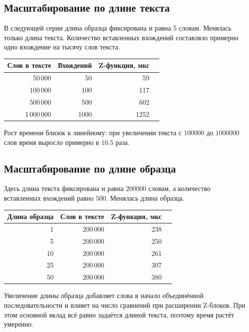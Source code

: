 \subsection{Масштабирование по длине текста}

В следующей серии длина образца фиксирована и равна 5 словам. Менялась только длина текста. Количество
вставленных вхождений составляло примерно одно вхождение на тысячу слов текста.

\begin{center}
\begin{tabular}{|r|r|r|r|}
\hline
\rowcolor{lightgray}
Слов в тексте & Вхождений & Z-функция, мкс \\
\hline
50\,000 & 50 & 59 \\
\hline
100\,000 & 100 & 117 \\
\hline
500\,000 & 500 & 602 \\
\hline
1\,000\,000 & 1000 & 1252 \\
\hline
\end{tabular}
\end{center}

Рост времени близок к линейному: при увеличении текста с \(100000\) до \(1000000\) слов
время выросло примерно в \(10.5\) раза.

\subsection{Масштабирование по длине образца}

Здесь длина текста фиксирована и равна \(200000\) словам, а количество вставленных вхождений равно
\(500\). Менялась длина образца.

\begin{center}
\begin{tabular}{|r|r|r|r|}
\hline
\rowcolor{lightgray}
Длина образца & Слов в тексте & Z-функция, мкс \\
\hline
1 & 200\,000 & 238 \\
\hline
5 & 200\,000 & 250 \\
\hline
10 & 200\,000 & 261 \\
\hline
25 & 200\,000 & 307 \\
\hline
50 & 200\,000 & 380 \\
\hline
\end{tabular}
\end{center}

Увеличение длины образца добавляет слова в начало объединённой последовательности и влияет на число
сравнений при расширении Z-блоков. При этом основной вклад всё равно задаётся длиной текста, поэтому
время растёт умеренно.

